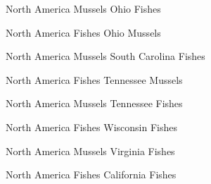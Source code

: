\documentclass[12pt]{article}
\begin{document}
{\begin{multicols}{2}
North America Mussels\newline
Ohio Fishes

\bigskip

North America Fishes\newline
Ohio Mussels

\bigskip

North America Mussels\newline
South Carolina Fishes

\bigskip

North America Fishes\newline
Tennessee Mussels

\bigskip

North America Mussels\newline
Tennessee Fishes

\bigskip

North America Fishes\newline
Wisconsin Fishes

\bigskip

North America Mussels\newline
Virginia Fishes

\bigskip

North America Fishes\newline
California Fishes
\end{multicols}
}
\end{document}
